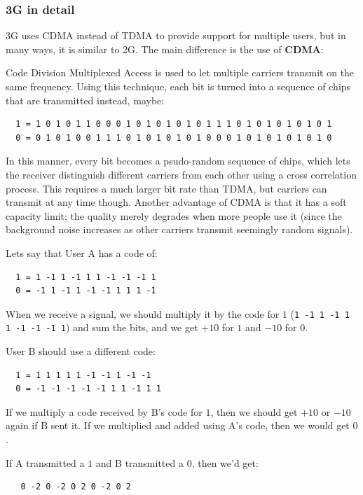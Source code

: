 \subsubsection{3G in detail}

3G uses CDMA instead of TDMA to provide support for multiple users, but in many
ways, it is similar to 2G. The main difference is the use of \textbf{CDMA}:

Code Division Multiplexed Access is used to let multiple carriers transmit
on the same frequency. Using this technique, each bit is turned into a 
sequence of chips that are transmitted instead, maybe:

\begin{verbatim}
  1 = 1 0 1 0 1 1 0 0 0 1 0 1 0 1 0 1 0 1 1 1 0 1 0 1 0 1 0 1 0 1
  0 = 0 1 0 1 0 0 1 1 1 0 1 0 1 0 1 0 1 0 0 0 1 0 1 0 1 0 1 0 1 0
\end{verbatim}

In this manner, every bit becomes a psudo-random sequence of chips, which
lets the receiver distinguish different carriers from each other using a
cross correlation process. This requires a much larger bit rate than TDMA,
but carriers can transmit at any time though. Another advantage of CDMA is
that it has a soft capacity limit; the quality merely degrades when more
people use it (since the background noise increases as other carriers
transmit seemingly random signals).

Lets say that User A has a code of:

\begin{verbatim}
  1 = 1 -1 1 -1 1 1 -1 -1 -1 1
  0 = -1 1 -1 1 -1 -1 1 1 1 -1
\end{verbatim}

When we receive a signal, we should multiply it by the code for $1$
(\texttt{1 -1 1 -1 1 1 -1 -1 -1 1}) and sum the bits, and we get $+10$ for
$1$ and $-10$ for $0$.

User B should use a different code:

\begin{verbatim}
  1 = 1 1 1 1 1 -1 -1 1 -1 -1 
  0 = -1 -1 -1 -1 -1 1 1 -1 1 1
\end{verbatim}

If we multiply a code received by B's code for $1$, then we should get $+10$
or $-10$ again if B sent it. If we multiplied and added using A's code, then
we would get $0$.

If A transmitted a $1$ and B transmitted a $0$, then we'd get:

\begin{verbatim}
   0 -2 0 -2 0 2 0 -2 0 2
\end{verbatim}

